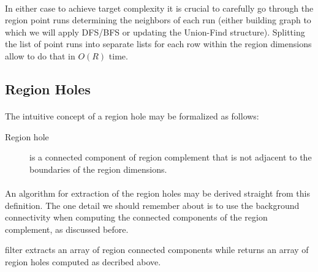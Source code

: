 \paragraph*{}
In either case to achieve target complexity it is crucial to carefully go through the region point runs determining the neighbors of each run (either building graph to which we will apply DFS/BFS or updating the Union-Find structure). Splitting the list of point runs into separate lists for each row within the region dimensions allow to do that in $O(R)$ time.

\subsection{Region Holes}

\paragraph*{}
The intuitive concept of a region hole may be formalized as follows:

\begin{description}
	\item[Region hole] is a connected component of region complement that is not adjacent to the boundaries of the region dimensions.
\end{description}

\paragraph*{}
An algorithm for extraction of the region holes may be derived straight from this definition. The one detail we should remember about is to use the background connectivity when computing the connected components of the region complement, as discussed before. 

\begin{refImpl}
\studio filter  extracts an array of region connected components while  returns an array of region holes computed as decribed above.
\end{refImpl}